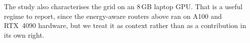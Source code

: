 \noindent The study also characterises the grid on an 8\,GB laptop GPU. That
is a useful regime to report, since the energy-aware routers above ran on
A100 and RTX~4090 hardware, but we treat it as context rather than as a
contribution in its own right.

